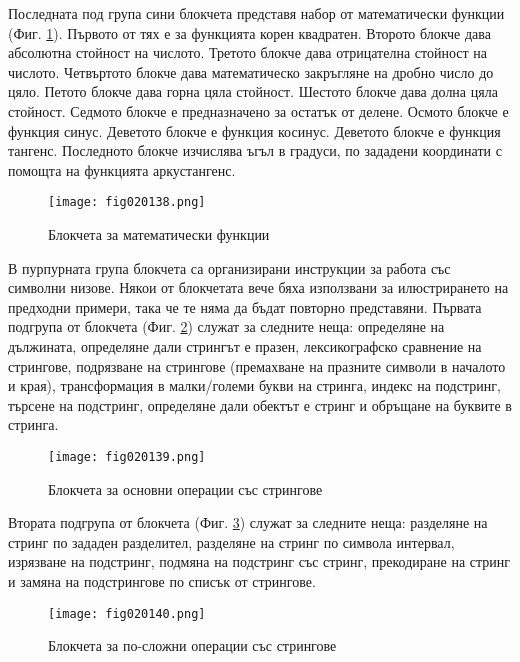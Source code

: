 Последната под група сини блокчета представя набор от математически функции (Фиг. \ref{fig020138}). Първото от тях е за функцията корен квадратен. Второто блокче дава абсолютна стойност на числото. Третото блокче дава отрицателна стойност на числото. Четвъртото блокче дава математическо закръгляне на дробно число до цяло. Петото блокче дава горна цяла стойност. Шестото блокче дава долна цяла стойност. Седмото блокче е предназначено за остатък от делене. Осмото блокче е функция синус. Деветото блокче е функция косинус. Деветото блокче е функция тангенс. Последното блокче изчислява ъгъл в градуси, по зададени координати с помощта на функцията аркустангенс. 

\begin{figure}[H]
  \centering
  \texttt{[image: fig020138.png]}
  \caption{Блокчета за математически функции}
\label{fig020138}
\end{figure}

В пурпурната група блокчета са организирани инструкции за работа със символни низове. Някои от блокчетата вече бяха използвани за илюстрирането на предходни примери, така че те няма да бъдат повторно представяни. Първата подгрупа от блокчета (Фиг. \ref{fig020139}) служат за следните неща: определяне на дължината, определяне дали стрингът е празен, лексикографско сравнение на стрингове, подрязване на стрингове (премахване на празните символи в началото и края), трансформация в малки/големи букви на стринга, индекс на подстринг, търсене на подстринг, определяне дали обектът е стринг и обръщане на буквите в стринга.

\begin{figure}[H]
  \centering
  \texttt{[image: fig020139.png]}
  \caption{Блокчета за основни операции със стрингове}
\label{fig020139}
\end{figure}

Втората подгрупа от блокчета (Фиг. \ref{fig020140}) служат за следните неща: разделяне на стринг по зададен разделител, разделяне на стринг по символа интервал, изрязване на подстринг, подмяна на подстринг със стринг, прекодиране на стринг и замяна на подстрингове по списък от стрингове.

\begin{figure}[H]
  \centering
  \texttt{[image: fig020140.png]}
  \caption{Блокчета за по-сложни операции със стрингове}
\label{fig020140}
\end{figure}


